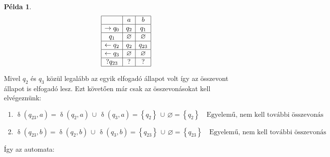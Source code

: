 \documentclass[a4paper,12pt]{article}
\theoremstyle{definition}
\newtheorem*{example}{Példa}
\DeclareMathOperator{\tr}{\delta}
\begin{document}
\begin{example}
\begin{table}[H]
			\centering
			$$
			\begin{array}{|c|c|c|}
				\hline
				& a & b \\
				\hline
				\rightarrow q_0 &  q_2 & q_1 \\
				\hline
				q_1 & \varnothing  &  \varnothing \\
				\hline
				\leftarrow q_2 & q_2 & q_{23}    \\
				\hline
				\leftarrow q_3 & \varnothing  & \varnothing \\
				\hline
				? q_{23}& ? & ? \\
				\hline
			\end{array}
			$$
		\end{table}
		\noindent
		Mivel $q_2$ és $q_3$ közül legalább az egyik elfogadó állapot volt így az összevont állapot is elfogadó lesz. Ezt követően már csak az összevonásokat kell elvégeznünk:
		\begin{enumerate}
			\item $ \tr{(q_{23}, a)} = \tr{(q_2, a)} \, \cup \, \tr{(q_3, a)} = \left\lbrace q_2 \right\rbrace \, \cup \, \varnothing = \left\lbrace q_2 \right\rbrace \quad \text{Egyelemű, nem kell további összevonás} $
			\item $ \tr{(q_{23}, b)} = \tr{(q_2, b)} \, \cup \, \tr{(q_3, b)} = \left\lbrace q_{23} \right\rbrace \, \cup \, \varnothing = \left\lbrace q_{23} \right\rbrace \quad \text{Egyelemű, nem kell további összevonás} $
		\end{enumerate}
		\noindent
		Így az automata:
		

\end{example}
\end{document}
